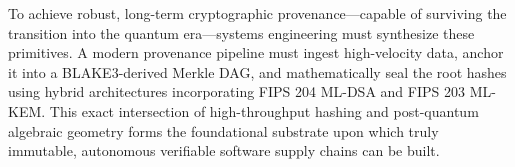 To achieve robust, long-term cryptographic provenance—capable of surviving the transition into the quantum era—systems engineering must synthesize these primitives. A modern provenance pipeline must ingest high-velocity data, anchor it into a BLAKE3-derived Merkle DAG, and mathematically seal the root hashes using hybrid architectures incorporating FIPS 204 ML-DSA and FIPS 203 ML-KEM. This exact intersection of high-throughput hashing and post-quantum algebraic geometry forms the foundational substrate upon which truly immutable, autonomous verifiable software supply chains can be built.
